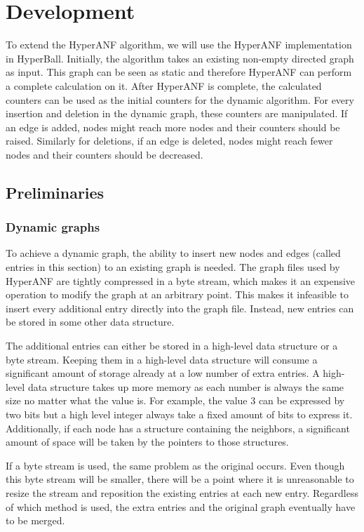 \chapter{Development}
To extend the HyperANF algorithm, we will use the HyperANF implementation in HyperBall. Initially, the algorithm takes an existing non-empty directed graph as input. This graph can be seen as static and therefore HyperANF can perform a complete calculation on it. After HyperANF is complete, the calculated counters can be used as the initial counters for the dynamic algorithm. For every insertion and deletion in the dynamic graph, these counters are manipulated. If an edge is added, nodes might reach more  nodes and their counters should be raised. Similarly for deletions, if an edge is deleted, nodes might reach fewer nodes and their counters should be decreased.

\section{Preliminaries}

\subsection{Dynamic graphs}

To achieve a dynamic graph, the ability to insert new nodes and edges (called entries in this section) to an existing graph is needed. The graph files used by HyperANF are tightly compressed in a byte stream, which makes it an expensive operation to modify the graph at an arbitrary point. This makes it infeasible to insert every additional entry directly into the graph file. Instead, new entries can be stored in some other data structure.

The additional entries can either be stored in a high-level data structure or a byte stream. Keeping them in a high-level data structure will consume a significant amount of storage already at a low number of extra entries. A high-level data structure takes up more memory as each number is always the same size no matter what the value is. For example, the value 3 can be expressed by two bits but a high level integer always take a fixed amount of bits to express it.  Additionally, if each node has a structure containing the neighbors, a significant amount of space will be taken by the pointers to those structures. 

If a byte stream is used, the same problem as the original occurs. Even though this byte stream will be smaller, there will be a point where it is unreasonable to resize the stream and reposition the existing entries at each new entry. Regardless of which method is used, the extra entries and the original graph eventually have to be merged.

